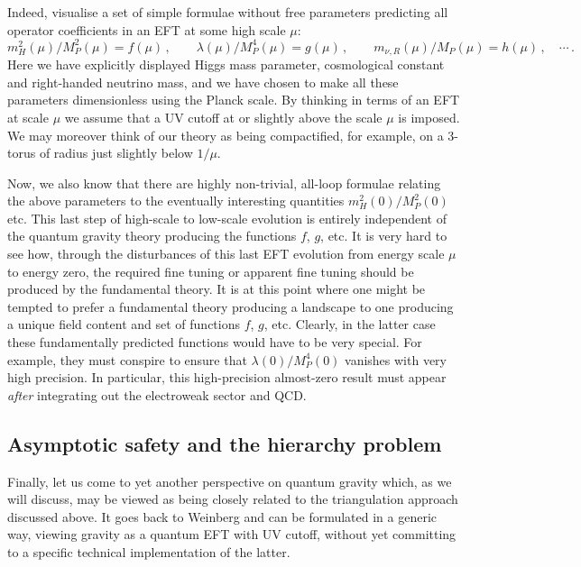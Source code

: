 \documentclass[12pt]{article}
\newcommand{\be}{\begin{equation}}
\newcommand{\ee}{\end{equation}}
\numberwithin{equation}{section}
\begin{document}
Indeed, visualise a set of simple formulae without free parameters predicting all operator coefficients in an EFT at some high scale $\mu$:
\be
m_H^2(\mu)/M_P^2(\mu)=f(\mu)\,,\qquad \lambda(\mu)/M_P^4(\mu)=g(\mu)\,, \qquad m_{\nu,R}(\mu)/M_P(\mu)=h(\mu)\,, \quad \cdots\,.
\ee
Here we have explicitly displayed Higgs mass parameter, cosmological constant and right-handed neutrino mass, and we have chosen to make all these parameters dimensionless using the Planck scale. By thinking in terms of an EFT at scale $\mu$ we assume that a UV cutoff at or slightly above the scale $\mu$ is imposed. We may moreover think of our theory as being compactified, for example, on a 3-torus of radius just slightly below $1/\mu$.

Now, we also know that there are highly non-trivial, all-loop formulae relating the above parameters to the eventually interesting quantities $m_H^2(0)/M_P^2(0)$ etc. This last step of high-scale to low-scale evolution is entirely independent of the quantum gravity theory producing the functions $f$, $g$, etc. It is very hard to see how, through the disturbances of this last EFT evolution from energy scale $\mu$ to energy zero, the required fine tuning or apparent fine tuning should be produced by the fundamental theory. It is at this point where one might be tempted to prefer a fundamental theory producing a landscape to one producing a unique field content and set of functions $f$, $g$, etc. Clearly, in the latter case these fundamentally predicted functions would have to be very special. For example, they must conspire to ensure that $\lambda(0)/M_P^4(0)$ vanishes with very high precision.
In particular, this high-precision almost-zero result must appear {\it after} integrating out the electroweak sector and QCD.





\subsection{Asymptotic safety and the hierarchy problem}

Finally, let us come to yet another perspective on quantum gravity which, as we will discuss, may be viewed as being closely related to the triangulation approach discussed above. It goes back to Weinberg \cite{Weinberg:1976xy} and can be formulated in a generic way, viewing gravity as a quantum EFT with UV cutoff, without yet committing to a specific technical implementation of the latter.
\end{document}
